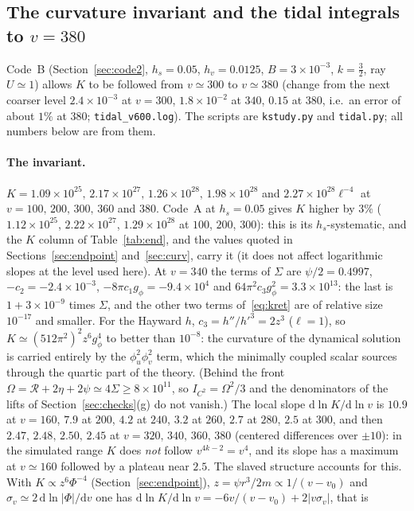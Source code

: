 \documentclass[11pt]{article}
\begin{document}
\subsection{The curvature invariant and the tidal integrals to \texorpdfstring{$v=380$}{v=380}}
\label{sec:curv2}

Code~B (Section~\ref{sec:code2}, $h_s=0.05$, $h_v=0.0125$, $B=3\times10^{-3}$, $k=\tfrac32$, ray $U\simeq1$) allows $K$ to be followed from $v\simeq300$ to $v\simeq380$ (change from the next coarser level $2.4\times10^{-3}$ at $v=300$, $1.8\times10^{-2}$ at $340$, $0.15$ at $380$, i.e.\ an error of about $1\%$ at $380$; \texttt{tidal\_v600.log}). The scripts are \texttt{kstudy.py} and \texttt{tidal.py}; all numbers below are from them.

\paragraph{The invariant.} $K=1.09\times10^{25},\,2.17\times10^{27},\,1.26\times10^{28},\,1.98\times10^{28}$ and $2.27\times10^{28}\ell^{-4}$ at $v=100,\,200,\,300,\,360$ and $380$. Code~A at $h_s=0.05$ gives $K$ higher by $3\%$ ($1.12\times10^{25}$, $2.22\times10^{27}$, $1.29\times10^{28}$ at $100$, $200$, $300$): this is its $h_s$-systematic, and the $K$ column of Table~\ref{tab:end}, and the values quoted in Sections~\ref{sec:endpoint} and~\ref{sec:curv}, carry it (it does not affect logarithmic slopes at the level used here). At $v=340$ the terms of $\Sigma$ are $\psi/2=0.4997$, $-c_2=-2.4\times10^{-3}$, $-8\pi c_1g_\phi=-9.4\times10^{4}$ and $64\pi^{2}c_3g_\phi^{2}=3.3\times10^{13}$: the last is $1+3\times10^{-9}$ times $\Sigma$, and the other two terms of~\eqref{eq:kret} are of relative size $10^{-17}$ and smaller. For the Hayward $h$, $c_3=h''/h'^{3}=2z^{3}$ ($\ell=1$), so $K\simeq(512\pi^{2})^{2}z^{6}g_\phi^{4}$ to better than $10^{-8}$: the curvature of the dynamical solution is carried entirely by the $\phi_u^{2}\phi_v^{2}$ term, which the minimally coupled scalar sources through the quartic part of the theory. (Behind the front $\Omega=\mathcal R+2\eta+2\psi\simeq4\Sigma\ge8\times10^{11}$, so $I_{C^{2}}=\Omega^{2}/3$ and the denominators of the lifts of Section~\ref{sec:checks}(g) do not vanish.) The local slope $\mathrm d\ln K/\mathrm d\ln v$ is $10.9$ at $v=160$, $7.9$ at $200$, $4.2$ at $240$, $3.2$ at $260$, $2.7$ at $280$, $2.5$ at $300$, and then $2.47,\,2.48,\,2.50,\,2.45$ at $v=320,\,340,\,360,\,380$ (centered differences over $\pm10$): in the simulated range $K$ does \emph{not} follow $v^{4k-2}=v^{4}$, and its slope has a maximum at $v\simeq160$ followed by a plateau near $2.5$. The slaved structure accounts for this. With $K\propto z^{6}\Phi^{-4}$ (Section~\ref{sec:endpoint}), $z=\psi r^{3}/2m\propto1/(v-v_0)$ and $\sigma_v\simeq2\,\mathrm d\ln|\Phi|/\mathrm dv$ one has $\mathrm d\ln K/\mathrm d\ln v=-6v/(v-v_0)+2|v\sigma_v|$, that is
\end{document}
